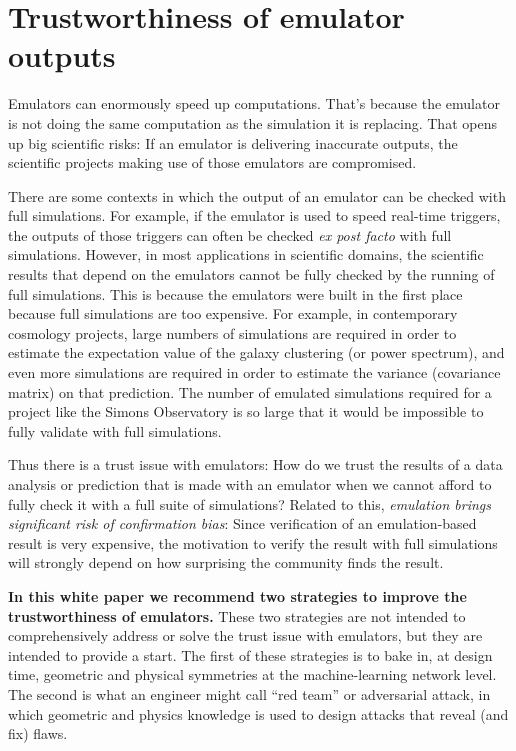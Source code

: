 \documentclass[10pt]{article}
\begin{document}
\section{Trustworthiness of emulator outputs}

Emulators can enormously speed up computations.
That's because the emulator is not doing the same computation as the simulation it is replacing.
That opens up big scientific risks:
If an emulator is delivering inaccurate outputs, the scientific projects making use of those emulators are compromised.

There are some contexts in which the output of an emulator can be checked with full simulations.
For example, if the emulator is used to speed real-time triggers, the outputs of those triggers can often be checked \textsl{ex post facto} with full simulations.
However, in most applications in scientific domains, the scientific results that depend on the emulators cannot be fully checked by the running of full simulations.
This is because the emulators were built in the first place because full simulations are too expensive.
For example, in contemporary cosmology projects, large numbers of simulations are required in order to estimate the expectation value of the galaxy clustering (or power spectrum), and even more simulations are required in order to estimate the variance (covariance matrix) on that prediction.
The number of emulated simulations required for a project like the Simons Observatory is so large that it would be impossible to fully validate with full simulations.

Thus there is a trust issue with emulators:
How do we trust the results of a data analysis or prediction that is made with an emulator when we cannot afford to fully check it with a full suite of simulations?
Related to this, \emph{emulation brings significant risk of confirmation bias}:
Since verification of an emulation-based result is very expensive, the motivation to verify the result with full simulations will strongly depend on how surprising the community finds the result.

\textbf{In this white paper we recommend two strategies to improve the trustworthiness of emulators.}
These two strategies are not intended to comprehensively address or solve the trust issue with emulators, but they are intended to provide a start.
The first of these strategies is to bake in, at design time, geometric and physical symmetries at the machine-learning network level.
The second is what an engineer might call ``red team'' or adversarial attack, in which geometric and physics knowledge is used to design attacks that reveal (and fix) flaws.
\end{document}
